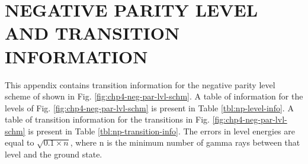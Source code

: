 %
%

\chapter{NEGATIVE PARITY LEVEL AND TRANSITION INFORMATION}
\label{app:neg-par-info}
This appendix contains transition information for the negative parity level scheme of \pr{} shown in Fig. \ref{fig:chp4-neg-par-lvl-schm}. A table of information for the levels of Fig. \ref{fig:chp4-neg-par-lvl-schm} is present in Table \ref{tbl:np-level-info}. A table of transition information for the transitions in Fig. \ref{fig:chp4-neg-par-lvl-schm} is present in Table \ref{tbl:np-transition-info}. The errors in level energies are equal to $\sqrt{0.1\times{}n}$, where n is the minimum number of gamma rays between that level and the ground state.

